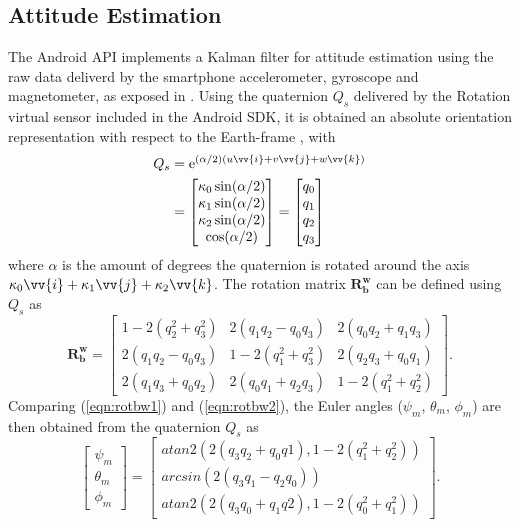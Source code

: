 \subsection{Attitude Estimation}
The Android API implements a Kalman filter for attitude estimation using the raw data deliverd by the smartphone accelerometer, gyroscope and magnetometer, as exposed in \cite{Astudillo2017}. Using the quaternion $Q_s$ delivered by the Rotation virtual sensor included in the Android SDK, it is obtained an absolute orientation representation with respect to the Earth-frame \cite{AndSensor}, with
\begin{align}\label{eqn:rotvector}
\begin{split}
Q_{s} &= \mathrm{e}^{(\alpha/2)(u\vv{i}+v\vv{j}+w\vv{k})} \\
&= \begin{bmatrix}
\kappa_{0}\sin(\alpha / 2)\\
\kappa_{1}\sin(\alpha / 2)\\
\kappa_{2}\sin(\alpha / 2)\\
\cos(\alpha / 2)
\end{bmatrix} = \begin{bmatrix}
q_{0} \\
q_{1} \\
q_{2} \\
q_{3}
\end{bmatrix}
\end{split}
\end{align}
where $\alpha$ is the amount of degrees the quaternion is rotated around the axis $\kappa_{0}\vv{i}+\kappa_{1}\vv{j}+\kappa_{2}\vv{k}$. The rotation matrix $\mathbf{R_{b}^{w}}$ can be defined using $Q_s$ as
\begin{equation}
\label{eqn:rotbw2}
\mathbf{R_{b}^{w}} = \begin{bmatrix}
1-2(q_{2}^{2}+q_{3}^{2}) & 2(q_{1}q_{2}-q_{0}q_{3}) & 2(q_{0}q_{2}+q_{1}q_{3}) \\
2(q_{1}q_{2}-q_{0}q_{3}) & 1-2(q_{1}^{2}+q_{3}^{2}) & 2(q_{2}q_{3}+q_{0}q_{1}) \\
2(q_{1}q_{3}+q_{0}q_{2}) & 2(q_{0}q_{1}+q_{2}q_{3}) & 1-2(q_{1}^{2}+q_{2}^{2})
\end{bmatrix}.
\end{equation}
Comparing (\ref{eqn:rotbw1}) and (\ref{eqn:rotbw2}), the Euler angles ($\psi_{m}$, $\theta_m$, $\phi_m$) are then obtained from the quaternion $Q_s$ as
\begin{equation}\label{eqn:quattoeu}
\begin{bmatrix}
\psi_{m} \\
\theta_{m} \\
\phi_{m}
\end{bmatrix} =
\begin{bmatrix}
atan2(2(q_{3}q_{2} + q_{0}q{1}),1-2(q_{1}^{2} + q_{2}^{2})) \\
arcsin(2(q_{3}q_{1} - q_{2}q_{0})) \\
atan2(2(q_{3}q_{0} + q_{1}q{2}),1-2(q_{0}^{2} + q_{1}^{2})) 
\end{bmatrix}.
\end{equation}

